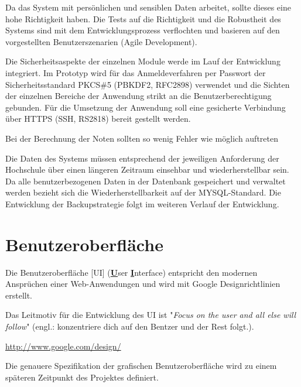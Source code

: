 \clearpage
		\begin{description}
			\item[Richtigkeit]  Da das System mit persönlichen und sensiblen Daten arbeitet, sollte dieses eine hohe Richtigkeit haben. Die Tests auf die Richtigkeit und die Robustheit des Systems sind mit dem Entwicklungsprozess verflochten und basieren auf den vorgestellten Benutzerszenarien (Agile Development). 
			\item[Sicherheit] Die Sicherheitsaspekte der einzelnen Module werde im Lauf der Entwicklung integriert.
			Im Prototyp wird für das Anmeldeverfahren per Passwort der Sicherheitsstandard PKCS\#5 (PBKDF2, RFC2898) verwendet und die Sichten der einzelnen Bereiche der Anwendung strikt an die Benutzerberechtigung gebunden. 
			Für die Umsetzung der Anwendung soll eine gesicherte Verbindung über HTTPS (SSH, RS2818) bereit gestellt werden.
			\item[Fehlertoleranz]  Bei der Berechnung der Noten sollten so wenig Fehler wie möglich auftreten 
			\item[Wiederherstellbarkeit]  Die Daten des Systems müssen entsprechend der jeweiligen Anforderung der Hochschule über einen längeren Zeitraum einsehbar und wiederherstellbar sein.
			Da alle benutzerbezogenen Daten in der Datenbank gespeichert und verwaltet werden bezieht sich die Wiederherstellbarkeit auf der MYSQL-Standard.
			Die Entwicklung der Backupstrategie folgt im weiteren Verlauf der Entwicklung.
		\end{description}	
	

	\section{Benutzeroberfläche}
	
	Die Benutzeroberfläche [UI] (\underline{\textbf{U}}ser \underline{\textbf{I}}nterface) entspricht den modernen Ansprüchen einer Web-Anwendungen und wird mit Google Designrichtlinien erstellt. 
	
 	Das Leitmotiv für die Entwicklung des UI  ist "\textit{Focus on the user and all else will follow}" (engl.: konzentriere dich auf den Bentzer und der Rest folgt.).
 	
 	 \url{http://www.google.com/design/}
	
	Die genauere Spezifikation der grafischen Benutzeroberfläche wird zu einem späteren Zeitpunkt des Projektes definiert. 
	
